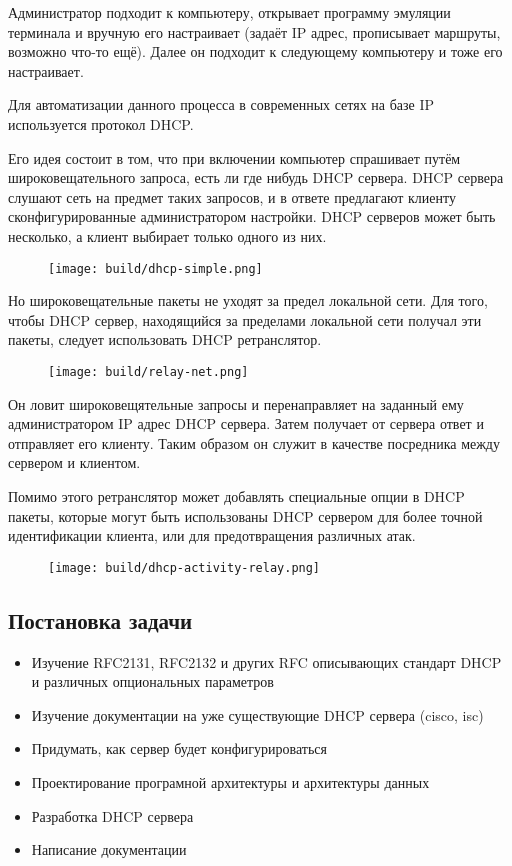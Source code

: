 \documentclass[14pt]{extarticle}
\begin{document}
Администратор подходит к компьютеру, открывает программу эмуляции терминала и вручную его настраивает
(задаёт IP адрес, прописывает маршруты, возможно что-то ещё).
Далее он подходит к следующему компьютеру и тоже его настраивает.

Для автоматизации данного процесса в современных сетях на базе IP используется протокол DHCP.

Его идея состоит в том, что при включении компьютер спрашивает путём широковещательного запроса, есть ли где нибудь DHCP сервера.
DHCP сервера слушают сеть на предмет таких запросов, и в ответе предлагают клиенту сконфигурированные администратором настройки.
DHCP серверов может быть несколько, а клиент выбирает только одного из них.

\begin{figure}[H]
    \centering
    \texttt{[image: build/dhcp-simple.png]}
    \caption{}
\end{figure}

Но широковещательные пакеты не уходят за предел локальной сети.
Для того, чтобы DHCP сервер, находящийся за пределами локальной сети получал эти пакеты, следует использовать DHCP ретранслятор.

\begin{figure}[H]
    \centering
    \texttt{[image: build/relay-net.png]}
    \caption{}
\end{figure}

Он ловит широковещятельные запросы и перенаправляет на заданный ему администратором IP адрес DHCP сервера.
Затем получает от сервера ответ и отправляет его клиенту.
Таким образом он служит в качестве посредника между сервером и клиентом.

Помимо этого ретранслятор может добавлять специальные опции в DHCP пакеты, которые могут быть использованы DHCP сервером для более точной идентификации клиента, или для предотвращения различных атак.


\begin{figure}[H]
    \centering
    \texttt{[image: build/dhcp-activity-relay.png]}
    \caption{}
\end{figure}

\subsection{Постановка задачи}

\begin{itemize}
    \item Изучение RFC2131, RFC2132 и других RFC описывающих стандарт DHCP и различных опциональных параметров
    \item Изучение документации на уже существующие DHCP сервера (cisco, isc)
    \item Придумать, как сервер будет конфигурироваться
    \item Проектирование програмной архитектуры и архитектуры данных
    \item Разработка DHCP сервера
    \item Написание документации
\end{itemize}
\end{document}
